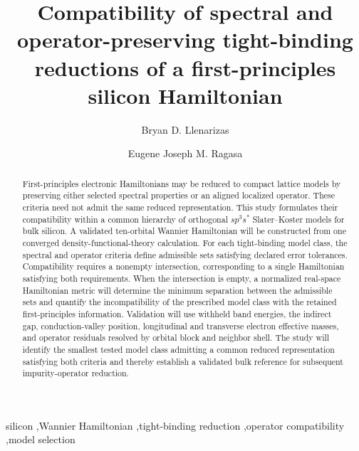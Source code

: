 \documentclass[preprint,12pt]{elsarticle}
\begin{document}
\begin{frontmatter}

\title{Compatibility of spectral and operator-preserving tight-binding
reductions of a first-principles silicon Hamiltonian}

\author[dlsu]{Bryan D. Llenarizas}

\author[dlsu]{Eugene Joseph M. Ragasa}

\address[dlsu]{Department of Physics, De La Salle University,
2401 Taft Avenue, Manila 0922, Philippines}

\begin{abstract}
First-principles electronic Hamiltonians may be reduced to compact lattice
models by preserving either selected spectral properties or an aligned
localized operator. These criteria need not admit the same reduced
representation. This study formulates their compatibility within a common
hierarchy of orthogonal $sp^3s^{\ast}$ Slater--Koster models for bulk silicon.
A validated ten-orbital Wannier Hamiltonian will be constructed from one
converged density-functional-theory calculation. For each tight-binding model
class, the spectral and operator criteria define admissible sets satisfying
declared error tolerances. Compatibility requires a nonempty intersection,
corresponding to a single Hamiltonian satisfying both requirements. When the
intersection is empty, a normalized real-space Hamiltonian metric will
determine the minimum separation between the admissible sets and quantify the
incompatibility of the prescribed model class with the retained
first-principles information. Validation will use withheld band energies, the
indirect gap, conduction-valley position, longitudinal and transverse electron
effective masses, and operator residuals resolved by orbital block and neighbor
shell. The study will identify the smallest tested model class admitting a
common reduced representation satisfying both criteria and thereby establish
a validated bulk reference for subsequent impurity-operator reduction.
\end{abstract}

\begin{keyword}
silicon \sep Wannier Hamiltonian \sep tight-binding reduction
\sep operator compatibility \sep model selection
\end{keyword}

\end{frontmatter}
\end{document}
